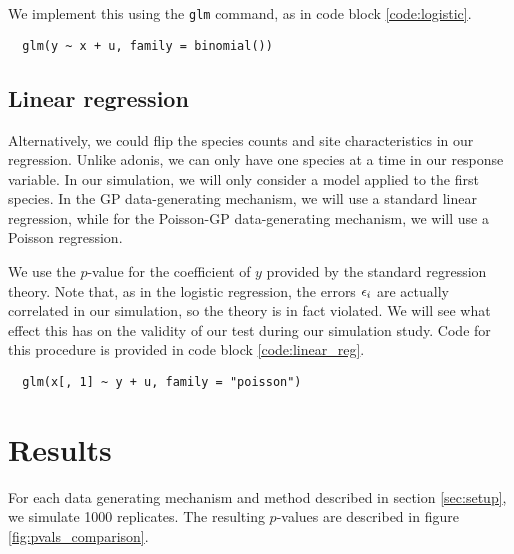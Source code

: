 \documentclass{article}
\newenvironment{code}{\captionsetup{type=listing}}{}
\begin{document}
We implement this using the \texttt{glm} command, as in code block
\ref{code:logistic}.

\begin{code}
\begin{verbatim}
  glm(y ~ x + u, family = binomial())
\end{verbatim}
\label{code:logistic}
\end{code}

\subsection{Linear regression}
\label{subsec:linear_regression}

Alternatively, we could flip the species counts and site characteristics in our
regression. Unlike adonis, we can only have one species at a time in our
response variable. In our simulation, we will only consider a model applied to
the first species. In the GP data-generating mechanism, we will use a standard
linear regression, while for the Poisson-GP data-generating mechanism, we will
use a Poisson regression.

We use the $p$-value for the coefficient of $y$ provided by the standard
regression theory. Note that, as in the logistic regression, the errors
$\epsilon_{i}$ are actually correlated in our simulation, so the theory is in fact
violated. We will see what effect this has on the validity of our test during
our simulation study. Code for this procedure is provided in code block
\ref{code:linear_reg}.

\begin{code}
\begin{verbatim}
  glm(x[, 1] ~ y + u, family = "poisson")
\end{verbatim}
\label{code:linear_reg}
\end{code}

\section{Results}
\label{sec:results}

For each data generating mechanism and method described in section
\ref{sec:setup}, we simulate 1000 replicates. The resulting $p$-values are
described in figure \ref{fig:pvals_comparison}.
\end{document}
